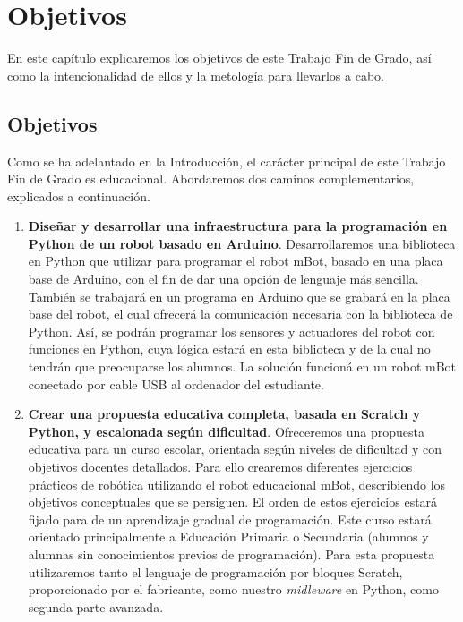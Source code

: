 \chapter{Objetivos}
\label{cap:objetivos}
En este capítulo explicaremos los objetivos de este Trabajo Fin de Grado, así como la intencionalidad de ellos y la metología para llevarlos a cabo.
\section{Objetivos}\label{sec:objetivos}
Como se ha adelantado en la Introducción, el carácter principal de este Trabajo Fin de Grado es educacional. Abordaremos dos caminos complementarios, explicados a continuación. 

\begin{enumerate}
	\item \textbf{Diseñar y desarrollar una infraestructura para la programación en Python de un robot basado en Arduino}. Desarrollaremos una biblioteca en Python que utilizar para programar el robot mBot, basado en una placa base de Arduino, con el fin de dar una opción de lenguaje más sencilla. También se trabajará en un programa en Arduino que se grabará en la placa base del robot, el cual ofrecerá la comunicación necesaria con la biblioteca de Python. Así, se podrán programar los sensores y actuadores del robot con funciones en Python, cuya lógica estará en esta biblioteca y de la cual no tendrán que preocuparse los alumnos. La solución funcioná en un robot mBot conectado por cable USB al ordenador del estudiante.
	
	\item \textbf{Crear una propuesta educativa completa, basada en Scratch y Python, y escalonada según dificultad}. Ofreceremos una propuesta educativa para un curso escolar, orientada según niveles de dificultad y con objetivos docentes detallados. Para ello crearemos diferentes ejercicios prácticos de robótica utilizando el robot educacional mBot, describiendo los objetivos conceptuales que se persiguen. El orden de estos ejercicios estará fijado para de un aprendizaje gradual de programación. Este curso estará orientado principalmente a Educación Primaria o Secundaria (alumnos y alumnas sin conocimientos previos de programación). Para esta propuesta utilizaremos tanto el lenguaje de programación por bloques Scratch, proporcionado por el fabricante, como nuestro \textit{midleware} en Python, como segunda parte avanzada.
\end{enumerate}


